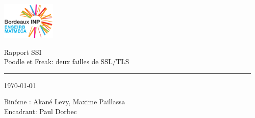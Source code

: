 \documentclass[a4paper,11pts]{article}
\begin{document}
\begin{center}

\includegraphics[width=100px]{img/enseirb-matmeca}

\Huge{Rapport SSI} \\
\Huge{Poodle et Freak: deux failles de SSL/TLS}
\noindent\rule{10cm}{0.4pt}

\normalsize{\today}

\vspace{1cm}

\Large{Bin\^ome : Akané Levy, Maxime Paillassa}\\
\Large{Encadrant: Paul Dorbec}

\end{center}

\clearpage



\newpage

\tableofcontents

\newpage






\end{document}
